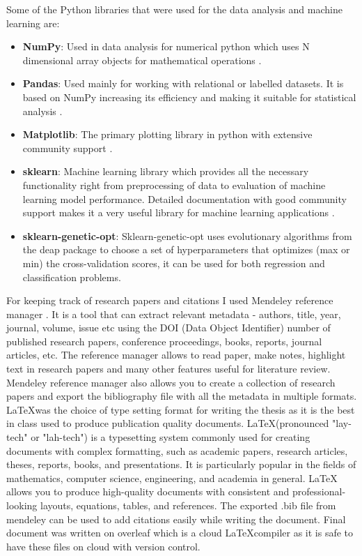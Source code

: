 Some of the Python libraries that were used for the data analysis and machine learning are:
\begin{itemize}
    \item \textbf{NumPy}: Used in data analysis for numerical python which uses N dimensional array objects for mathematical operations \citep{NUMPY}.  
    \item \textbf{Pandas}: Used mainly for working with relational or labelled datasets. It is based on NumPy increasing its efficiency and making it suitable for statistical analysis \citep{PANDAS}.
    \item \textbf{Matplotlib}: The primary plotting library in python with extensive community support \citep{MATPLOTLIB}.
    \item \textbf{sklearn}: Machine learning library which provides all the necessary functionality right from preprocessing of data to evaluation of machine learning model performance. Detailed documentation with good community support makes it a very useful library for machine learning applications \citep{scikit-learn} \citep{sklearn_api}.
    \item \textbf{sklearn-genetic-opt}: Sklearn-genetic-opt uses evolutionary algorithms from the deap package to choose a set of hyperparameters that optimizes (max or min) the cross-validation scores, it can be used for both regression and classification problems.
\end{itemize}

For keeping track of research papers and citations I used Mendeley reference manager \citep{Mendeley}. It is a tool that can extract relevant metadata - authors, title, year, journal, volume, issue etc using the DOI (Data Object Identifier) number of published research papers, conference proceedings, books, reports, journal articles, etc. The reference manager allows to read paper, make notes, highlight text in research papers and many other features useful for literature review. Mendeley reference manager also allows you to create a collection of research papers and export the bibliography file with all the metadata in multiple formats. \LaTeX was the choice of type setting format for writing the thesis as it is the best in class used to produce publication quality documents. \LaTeX (pronounced "lay-tech" or "lah-tech") is a typesetting system commonly used for creating documents with complex formatting, such as academic papers, research articles, theses, reports, books, and presentations. It is particularly popular in the fields of mathematics, computer science, engineering, and academia in general. LaTeX allows you to produce high-quality documents with consistent and professional-looking layouts, equations, tables, and references. The exported .bib file from mendeley can be used to add citations easily while writing the document. Final document was written on overleaf which is a cloud \LaTeX compiler as it is safe to have these files on cloud with version control. 